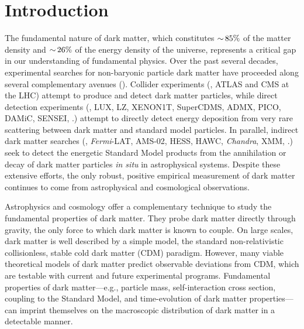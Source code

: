 \chapter{Introduction} 
\label{sec:intro}
\bigskip


The fundamental nature of dark matter, which constitutes $ {\sim}\, 85\%$ of the matter density and $ {\sim}\, 26\%$ of the energy density of the universe, represents a critical gap in our understanding of fundamental physics.
Over the past several decades, experimental searches for non-baryonic particle dark matter have proceeded along several complementary avenues ().
Collider experiments (\eg, ATLAS and CMS at the LHC) attempt to produce and detect dark matter particles, while  %
direct detection experiments (\eg, LUX, LZ, XENON1T, SuperCDMS, ADMX, PICO, DAMiC, SENSEI, \etc.) attempt to directly detect energy deposition from very rare scattering between dark matter and standard model particles.
In parallel, indirect dark matter searches (\eg, {\it Fermi}-LAT, AMS-02, HESS, HAWC, {\it Chandra}, XMM, \etc.) seek to detect the energetic Standard Model products from the annihilation or decay of dark matter particles {\it in situ} in astrophysical systems. %
Despite these extensive efforts, the only robust, positive empirical measurement of dark matter continues to come from astrophysical and cosmological observations. 

Astrophysics and cosmology offer a complementary technique to study the fundamental properties of dark matter. 
They probe dark matter directly through gravity, the only force to which dark matter is known to couple. On large scales, dark matter is well described by a simple model, the standard non-relativistic collisionless, stable cold dark matter (CDM) paradigm.
However, many viable theoretical models of dark matter predict observable deviations from CDM, which are testable with current and future experimental programs.
Fundamental properties of dark matter---e.g., particle mass, self-interaction cross section, coupling to the Standard Model, and time-evolution of dark matter properties---can imprint themselves on the macroscopic distribution of dark matter in a detectable manner.

